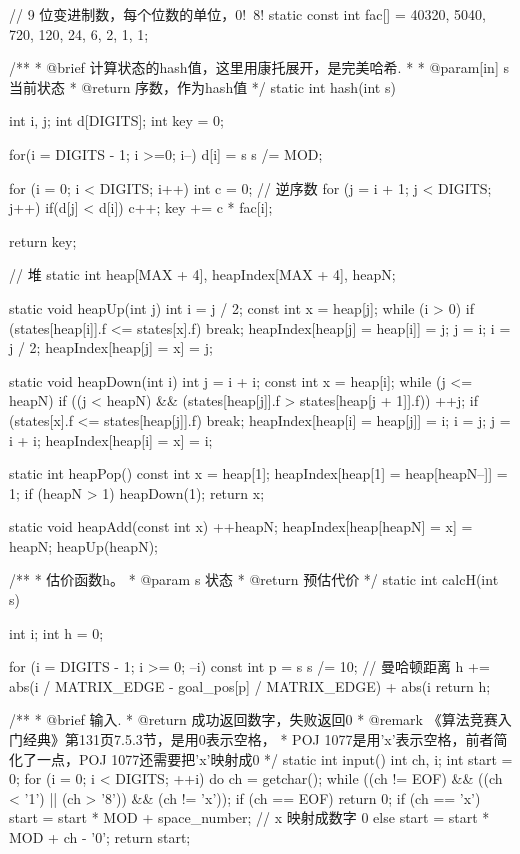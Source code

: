 \begin{Codex}[label=eight_digits_astar.c]
// 9 位变进制数，每个位数的单位，0!~8!
static const int fac[] = {40320, 5040, 720, 120, 24, 6, 2, 1, 1};

/**
 * @brief 计算状态的hash值，这里用康托展开，是完美哈希.
 *
 * @param[in] s 当前状态
 * @return 序数，作为hash值
 */
static int hash(int s) {
    int i, j;
    int d[DIGITS];
    int key = 0;

    for(i = DIGITS - 1; i >=0; i--) {
        d[i] = s %
        s /= MOD;
    }
    
    for (i = 0; i < DIGITS; i++) {
        int c = 0; // 逆序数
        for (j = i + 1; j < DIGITS; j++) {
            if(d[j] < d[i]) {
                c++;
            }
        }
        key += c * fac[i];
    }
    
    return key;
}

// 堆
static int heap[MAX + 4], heapIndex[MAX + 4], heapN;

static void heapUp(int j) {
    int i = j / 2;
    const int x = heap[j];
    while (i > 0) {
        if (states[heap[i]].f <= states[x].f) break;
        heapIndex[heap[j] = heap[i]] = j;
        j = i;
        i = j / 2;
    }
    heapIndex[heap[j] = x] = j;
}

static void heapDown(int i) {
    int j = i + i;
    const int x = heap[i];
    while (j <= heapN) {
        if ((j < heapN) && (states[heap[j]].f >
            states[heap[j + 1]].f)) ++j;
        if (states[x].f <= states[heap[j]].f) break;
        heapIndex[heap[i] = heap[j]] = i;
        i = j;
        j = i + i;
    }
    heapIndex[heap[i] = x] = i;
}

static int heapPop() {
    const int x = heap[1];
    heapIndex[heap[1] = heap[heapN--]] = 1;
    if (heapN > 1) {
        heapDown(1);
    }
    return x;
}

static void heapAdd(const int x) {
    ++heapN;
    heapIndex[heap[heapN] = x] = heapN;
    heapUp(heapN);
}

/**
 * 估价函数h。
 * @param s 状态
 * @return 预估代价
 */
static int calcH(int s) {
    int i;
    int h = 0;
    
    for (i = DIGITS - 1; i >= 0; --i) {
        const int p = s %
        s /= 10;
        // 曼哈顿距离
        h += abs(i / MATRIX_EDGE - goal_pos[p] / MATRIX_EDGE) +
            abs(i %
    }
    return h;
}

/**
 * @brief 输入.
 * @return  成功返回数字，失败返回0
 * @remark 《算法竞赛入门经典》第131页7.5.3节，是用0表示空格，
 * POJ 1077是用'x'表示空格，前者简化了一点，POJ 1077还需要把'x'映射成0
 */
static int input() {
    int ch, i;
    int start = 0;
    for (i = 0; i < DIGITS; ++i) {
        do {
            ch = getchar();
        } while ((ch != EOF) && ((ch < '1') || (ch > '8')) && (ch != 'x'));
        if (ch == EOF) return 0;
        if (ch == 'x') start = start * MOD + space_number; // x 映射成数字 0
        else             start = start * MOD + ch - '0';
    }
    return start;
}


\end{Codex}
